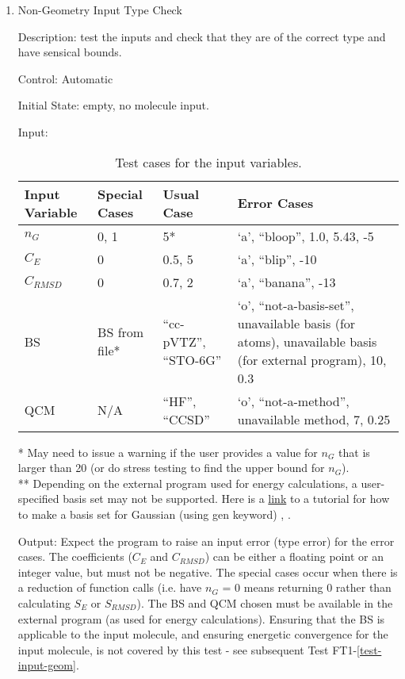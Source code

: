 \documentclass[12pt, titlepage]{article}
\begin{document}
\begin{enumerate}

\item Non-Geometry Input Type Check

Description: test the inputs and check that they are of the correct type and 
have sensical bounds.

Control: Automatic

Initial State: empty, no molecule input.

Input:
\begin{table}[H]
	\begin{tabular}{p{3cm}p{3cm}p{2.5cm}p{4cm}}
		\toprule
		Input Variable & Special Cases & Usual Case & Error Cases \\
		\midrule
		$n_G$    & 0, 1        & 5*          & `a', ``bloop'', 1.0, 5.43, -5 \\
		$C_E$    & 0          & 0.5, 5        & `a', ``blip'', -10 \\
		$C_{RMSD}$ & 0        & 0.7, 2       & `a', ``banana'', -13 \\
		BS       & BS from file*  & ``cc-pVTZ'', ``STO-6G'' & 
		`o', ``not-a-basis-set'', unavailable basis (for atoms), unavailable 
		basis (for external program), 10, 0.3 \\
		QCM      & N/A           & ``HF'', ``CCSD'' & `o', ``not-a-method'', 
		unavailable method, 7, 
		0.25 
		\\
		\bottomrule
	\end{tabular}
\label{table-inputs}
\caption{Test cases for the input variables.}
\end{table}

* May need to issue a warning if the user provides a value for $n_G$ that is 
larger than 20 (or do stress testing to find the upper bound for
$n_G$). \\
** Depending on the external program used for energy calculations, a 
user-specified basis set may not be supported. Here is a 
\href{https://joaquinbarroso.com/2011/11/02/gen-keyword-gaussian/}{link} to a 
tutorial for how to make a basis set for Gaussian (using gen keyword) 
\cite{link-gen-basis}, \cite{g16}.

Output: Expect the program to raise an input error (type error) for the error 
cases. The coefficients ($C_E$ and $C_{RMSD}$) can be either a floating point 
or an integer value, but must not be negative. The special cases occur when 
there is a reduction of function calls (i.e. have $n_G$ = 0 means returning 0 
rather than calculating $S_E$ or $S_{RMSD}$). The BS and QCM chosen must be 
available in the external program (as used for energy calculations). Ensuring 
that the BS is applicable to the input molecule, and ensuring energetic 
convergence for the input molecule, is not covered by this test - see 
subsequent Test FT1-\ref{test-input-geom}.


\end{enumerate}
\end{document}

